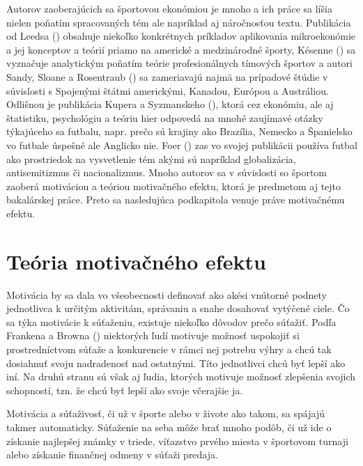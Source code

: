 \documentclass[
  digital, %
  oneside, %
  notable,   %
  lof,     %
  lot,     %
]{fithesis3}
\begin{document}
	Autorov zaoberajúcich sa športovou ekonómiou je mnoho a ich práce sa líšia nielen poňatím spracovaných tém ale napríklad aj náročnosťou textu. Publikácia od Leedsa (\citeyear{leeds2018}) obsahuje niekoľko konkrétnych príkladov aplikovania mikroekonómie a jej konceptov a teórií priamo na americké a medzinárodné športy, Késenne (\citeyear{kesenne2014}) sa vyznačuje analytickým poňatím teórie profesionálnych tímových športov a autori Sandy, Sloane a Rosentraub (\citeyear{sandy2004}) sa zameriavajú najmä na prípadové štúdie v súvislosti s Spojenými štátmi americkými, Kanadou, Európou a Austráliou. Odlišnou je publikácia Kupera a Syzmanskeho (\citeyear{kuper2009}), ktorá cez ekonómiu, ale aj štatistiku, psychológiu a teóriu hier odpovedá na mnohé zaujímavé otázky týkajúceho sa futbalu, napr. prečo sú krajiny ako Brazília, Nemecko a Španielsko vo futbale úspešné ale Anglicko nie. Foer (\citeyear{foer2004}) zas vo svojej publikácii používa futbal ako prostriedok na vysvetlenie tém akými sú napríklad globalizácia, antisemitizmus či nacionalizmus. Mnoho autorov sa v súvislosti so športom zaoberá motiváciou a teóriou motivačného efektu, ktorá je predmetom aj tejto bakalárskej práce. Preto sa nasledujúca podkapitola venuje práve motivačnému efektu.
	
		\section{Teória motivačného efektu}
		Motivácia by sa dala vo všeobecnosti definovať ako akési vnútorné podnety jednotlivca k určitým aktivitám, správaniu a snahe dosahovať vytýčené ciele. Čo sa týka motivácie k súťaženiu, existuje niekoľko dôvodov prečo súťažiť. Podľa Frankena a Browna (\citeyear[s.~176]{franken1995}) niektorých ľudí motivuje možnosť uspokojiť si prostredníctvom súťaže a konkurencie v rámci nej potrebu výhry a chcú tak dosiahnuť svoju nadradenosť nad ostatnými. \parencite{nicholls1989} Títo jednotlivci chcú byť lepší ako iní. Na druhú stranu sú však aj ľudia, ktorých motivuje možnosť zlepšenia svojich schopností, tzn. že chcú byť lepší ako svoje včerajšie ja.
		
		Motivácia a súťaživosť, či už v športe alebo v živote ako takom, sa spájajú takmer automaticky. Súťaženie na seba môže brať mnoho podôb, či už ide o získanie najlepšej známky v triede, víťazstvo prvého miesta v športovom turnaji alebo získanie finančnej odmeny v súťaži predaja. \parencite[s.~210]{tauer1999}
		
\end{document}
